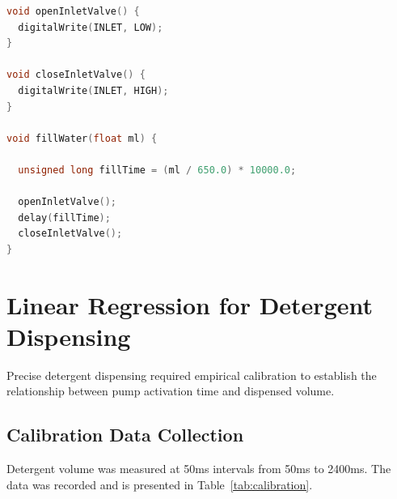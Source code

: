 \begin{lstlisting}[language=C++, caption=Water Inlet Function, label=lst:water]
void openInletValve() {
  digitalWrite(INLET, LOW);
}

void closeInletValve() {
  digitalWrite(INLET, HIGH);
}

void fillWater(float ml) {

  unsigned long fillTime = (ml / 650.0) * 10000.0;

  openInletValve();
  delay(fillTime);
  closeInletValve();
}
\end{lstlisting}

\section{Linear Regression for Detergent Dispensing}
Precise detergent dispensing required empirical calibration to establish the relationship between pump activation time and dispensed volume.

\subsection{Calibration Data Collection}
Detergent volume was measured at 50ms intervals from 50ms to 2400ms. The data was recorded and is presented in Table~\ref{tab:calibration}.



